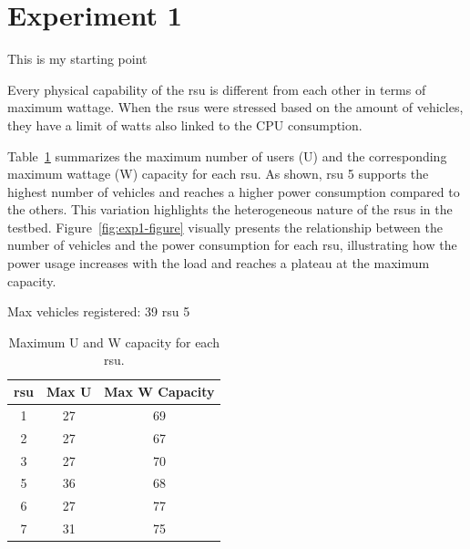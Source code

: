 \section{Experiment 1}\label{exp:1}
This is my starting point \cite{3gpp-ts-22-186,3gpp_ts_26_511_v18_1_0}

Every physical capability of the \gls{rsu} is different from each other in terms of maximum wattage.
When the \glspl{rsu} were stressed based on the amount of vehicles, they have a limit of watts also linked to the CPU consumption.




Table~\ref{tab:rsu-max-capacity} summarizes the maximum number of users (U) and the corresponding maximum wattage (W) capacity for each \gls{rsu}. As shown, \gls{rsu} 5 supports the highest number of vehicles and reaches a higher power consumption compared to the others. This variation highlights the heterogeneous nature of the \glspl{rsu} in the testbed. Figure~\ref{fig:exp1-figure} visually presents the relationship between the number of vehicles and the power consumption for each \gls{rsu}, illustrating how the power usage increases with the load and reaches a plateau at the maximum capacity.

Max vehicles registered: 39 \gls{rsu} 5
\begin{table}[ht]
    \centering
    \caption{Maximum U and W capacity for each \gls{rsu}.}
    \begin{tabular}{ccc}
        \hline
        \gls{rsu} & Max U & Max W Capacity \\
        \hline
        1         & 27    & 69             \\
        2         & 27    & 67             \\
        3         & 27    & 70             \\
        5         & 36    & 68             \\
        6         & 27    & 77             \\
        7         & 31    & 75             \\
        \hline
    \end{tabular}
    \label{tab:rsu-max-capacity}
\end{table}


